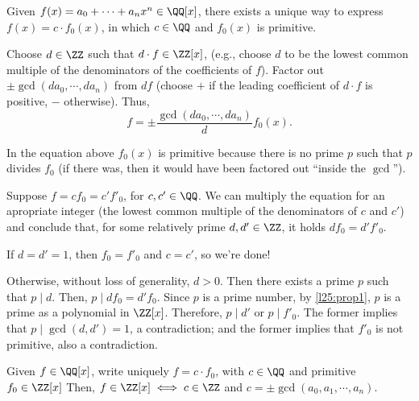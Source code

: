 \begin{lem}\label{l25:lem3}
	Given $f(x) = a_0 + \cdots + a_nx^n \in \QQ[x]$, there exists a unique way to express $f(x) = c \cdot f_0(x)$, in which $c \in \QQ$ and $f_0(x)$ is primitive.	
\end{lem}

\begin{dem}[Existence]
	Choose $d \in \ZZ$ such that $d\cdot f \in \ZZ[x]$, (e.g., choose $d$ to be the lowest common multiple of the denominators of the coefficients of $f$).
	Factor out $\pm\gcd(da_0, \cdots, da_n)$ from $df$ (choose $+$ if the leading coefficient of $d\cdot f$ is positive, $-$ otherwise). Thus, 
	\[f = \pm \frac{\gcd(da_0, \cdots, da_n)}{d}f_0(x).\]

	In the equation above $f_0(x)$ is primitive because there is no prime $p$ such that $p$ divides $f_0$ (if there was, then it would have been factored out ``inside the $\gcd$''). 
\end{dem}

\begin{dem}[Uniqueness]
	Suppose $f = cf_0 = c'f'_0$, for $c, c' \in \QQ$. We can multiply the equation for an apropriate integer (the lowest common multiple of the denominators of $c$ and $c'$) and conclude that, for some relatively prime $d, d' \in \ZZ$, it holds $df_0 = d'f'_ 0$.

	If $d = d' = 1$, then $f_0 = f'_0$ and $c = c'$, so we're done!

	Otherwise, without loss of generality, $d > 0$. Then there exists a prime $p$ such that $p \mid d$. Then, $p \mid df_ 0 = d'f_0$. Since $p$ is a prime number, by \cref{l25:prop1}, $p$ is a prime as a polynomial in $\ZZ[x]$. Therefore, $p \mid d'$ or $p \mid f'_0$. The former implies that $p \mid \gcd(d, d') = 1$, a contradiction; and the former implies that $f'_0$ is not primitive, also a contradiction. 
\end{dem}

\begin{cor}\label{l25:cor5}
	Given $f \in \QQ[x]$, write uniquely $f = c \cdot f_0$, with $c \in \QQ$ and primitive $f_0 \in \ZZ[x]$	
	Then, $f \in \ZZ[x] \iff c\in\ZZ$ and $c = \pm\gcd(a_0, a_1, \cdots, a_n)$.	
\end{cor}
